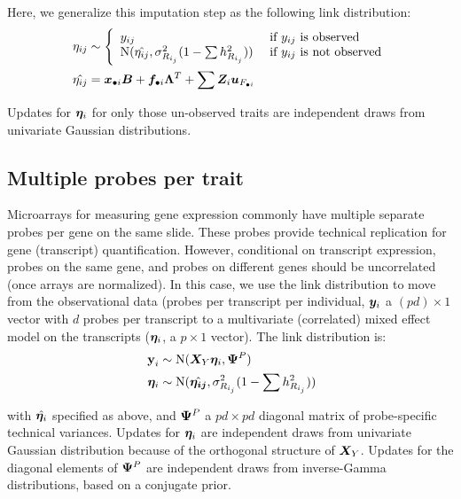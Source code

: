 \documentclass[11pt]{amsart}
\newcommand*{\B}[1]{\ifmmode\bm{#1}\else\textbf{#1}\fi}
\begin{document}
Here, we generalize this imputation step as the following link distribution:
\begin{align} \begin{split}
\eta_{ij} &\sim \Bigg\{\begin{array}{l l}
y_{ij} & \mbox{ if } y_{ij} \mbox{ is observed} \\
\mbox{N}(\hat{\eta_{ij}},\sigma^2_{R_{i_j}}(1-\sum h^2_{R_{i_j}})) & \mbox{ if } y_{ij} \mbox{ is not observed}
\end{array} \\
\hat{\eta_{ij}} &= \B{x}_{\bullet i} \B{B} + \B{f}_{\bullet i} \B{\Lambda}^T + \sum \B{Z}_i \B{u}_{F_{\bullet i}}
\end{split}\end{align}

\noindent Updates for $\B{\eta}_i$ for only those un-observed traits are independent draws from univariate Gaussian distributions. 

\subsection{Multiple probes per trait}
Microarrays for measuring gene expression commonly have multiple separate probes per gene on the same slide. These probes provide technical replication for gene (transcript) quantification. However, conditional on transcript expression, probes on the same gene, and probes on different genes should be uncorrelated (once arrays are normalized). In this case, we use the link distribution to move from the observational data (probes per transcript per individual, $\B{y}_i$ a $(p d) \times 1$ vector with $d$ probes per transcript to a multivariate (correlated) mixed effect model on the transcripts ($\B{\eta}_i$, a $p \times 1$ vector). The link distribution is:
\begin{align} \begin{split}
\B{y}_i &\sim \mbox{N}(\B{X}_Y \B{\eta}_i, \B{\Psi}^P) \\
\;\B{\eta}_i &\sim \mbox{N}(\hat{\B{\eta_{ij}}},\sigma^2_{R_{i_j}}(1-\sum h^2_{R_{i_j}}))
\end{split}\end{align}

\noindent with $\hat{\B{\eta}_i}$ specified as above, and $\B{\Psi}^P$ a $pd \times pd$ diagonal matrix of probe-specific technical variances. Updates for $\B{\eta}_i$ are independent draws from univariate Gaussian distribution because of the orthogonal structure of $\B{X}_Y$. Updates for the diagonal elements of $\B{\Psi}^P$ are independent draws from inverse-Gamma distributions, based on a conjugate prior.
\end{document}

